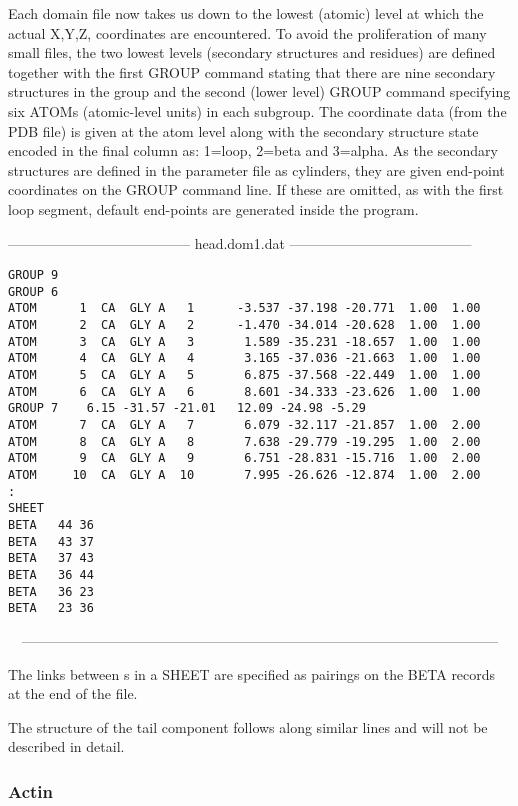 Each domain file now takes us down to the lowest (atomic) level at which the actual
X,Y,Z, coordinates are encountered.   To avoid the proliferation of many small files,
the two lowest levels (secondary structures and residues) are defined together with
the first GROUP command stating that there are nine secondary structures in the 
group and the second (lower level) GROUP command specifying six ATOMs (atomic-level
units) in each subgroup.   The coordinate data (from the PDB file) is given at the
atom level along with the secondary structure state encoded in the final column as:
1=loop, 2=beta and 3=alpha.   As the secondary structures are defined in the
parameter file as cylinders, they are given end-point coordinates on the GROUP
command line.  If these are omitted, as with the first loop segment, default 
end-points are generated inside the program.

\begin{singlespace}
---------------------------------------
head.dom1.dat
---------------------------------------
\begin{verbatim}
GROUP 9
GROUP 6 
ATOM      1  CA  GLY A   1      -3.537 -37.198 -20.771  1.00  1.00
ATOM      2  CA  GLY A   2      -1.470 -34.014 -20.628  1.00  1.00
ATOM      3  CA  GLY A   3       1.589 -35.231 -18.657  1.00  1.00
ATOM      4  CA  GLY A   4       3.165 -37.036 -21.663  1.00  1.00
ATOM      5  CA  GLY A   5       6.875 -37.568 -22.449  1.00  1.00
ATOM      6  CA  GLY A   6       8.601 -34.333 -23.626  1.00  1.00
GROUP 7    6.15 -31.57 -21.01   12.09 -24.98 -5.29
ATOM      7  CA  GLY A   7       6.079 -32.117 -21.857  1.00  2.00
ATOM      8  CA  GLY A   8       7.638 -29.779 -19.295  1.00  2.00
ATOM      9  CA  GLY A   9       6.751 -28.831 -15.716  1.00  2.00
ATOM     10  CA  GLY A  10       7.995 -26.626 -12.874  1.00  2.00
:
SHEET
BETA   44 36
BETA   43 37
BETA   37 43
BETA   36 44
BETA   36 23
BETA   23 36
\end{verbatim}
\ \ ------------------------------------------------------------------------------------------------------
\end{singlespace}

The links between \Bs s in a SHEET are specified as pairings on the BETA
records at the end of the file.

The structure of the tail component follows along similar lines and will not
be described in detail.

\subsubsection{Actin}

